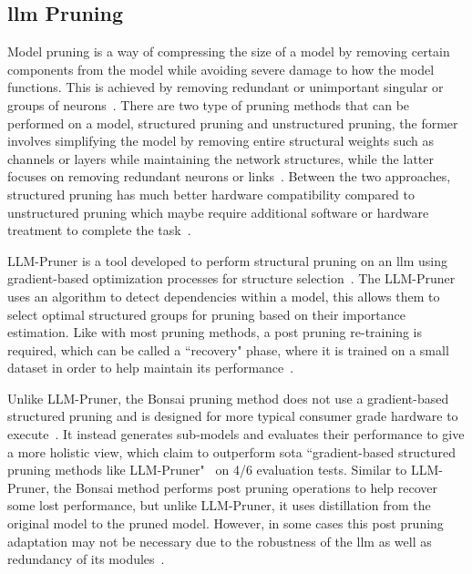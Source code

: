 \documentclass{ifacconf}
\begin{document}
	\subsection{\gls{llm} Pruning}
	Model pruning is a way of compressing the size of a model by removing certain components from the model while avoiding severe damage to how the model functions. This is achieved by removing redundant or unimportant singular or groups of neurons~\cite{huang2024largelanguagemodelpruning}. There are two type of pruning methods that can be performed on a model, structured pruning and unstructured pruning, the former involves simplifying the model by removing entire structural weights such as channels or layers while maintaining the network structures, while the latter focuses on removing redundant neurons or links~\cite{huang2024largelanguagemodelpruning}. Between the two approaches, structured pruning has much better hardware compatibility compared to unstructured pruning which maybe require additional software or hardware treatment to complete the task~\cite{huang2024largelanguagemodelpruning}.
	
	LLM-Pruner is a tool developed to perform structural pruning on an \gls{llm} using gradient-based optimization processes for structure selection~\cite{ma2023llmprunerstructuralpruninglarge}. The LLM-Pruner uses an algorithm to detect dependencies within a model, this allows them to select optimal structured groups for pruning based on their importance estimation. Like with most pruning methods, a post pruning re-training is required, which can be called a ``recovery" phase, where it is trained on a small dataset in order to help maintain its performance~\cite{ma2023llmprunerstructuralpruninglarge}.
	
	Unlike LLM-Pruner, the Bonsai pruning method does not use a gradient-based structured pruning and is designed for more typical consumer grade hardware to execute~\cite{dery2024everybodyprunenowstructured}. It instead generates sub-models and evaluates their performance to give a more holistic view, which claim to outperform \gls{sota} ``gradient-based structured pruning methods like LLM-Pruner"~\cite[p.~2]{dery2024everybodyprunenowstructured} on 4/6 evaluation tests. Similar to LLM-Pruner, the Bonsai method performs post pruning operations to help recover some lost performance, but unlike LLM-Pruner, it uses distillation from the original model to the pruned model. However, in some cases this post pruning adaptation may not be necessary due to the robustness of the \gls{llm} as well as redundancy of its modules~\cite{dery2024everybodyprunenowstructured}.
	
\end{document}
